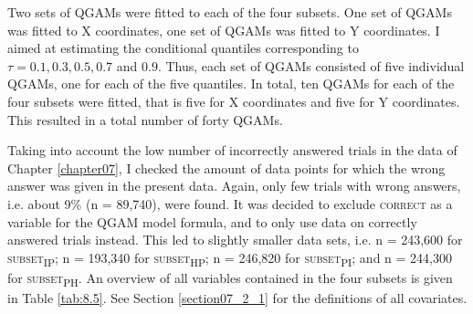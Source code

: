 Two sets of QGAMs were fitted to each of the four subsets. One set of QGAMs was fitted to X coordinates, one set of QGAMs was fitted to Y coordinates. I aimed at estimating the conditional quantiles corresponding to $\tau=0.1,0.3,0.5,0.7$ and $0.9$. Thus, each set of QGAMs consisted of five individual QGAMs, one for each of the five quantiles. In total, ten QGAMs for each of the four subsets were fitted, that is five for X coordinates and five for Y coordinates. This resulted in a total number of forty QGAMs.

Taking into account the low number of incorrectly answered trials in the data of Chapter \ref{chapter07}, I checked the amount of data points for which the wrong answer was given in the present data. Again, only few trials with wrong answers, i.e. about 9\% (n = 89,740), were found. It was decided to exclude \textsc{correct} as a variable for the QGAM model formula, and to only use data on correctly answered trials instead. This led to slightly smaller data sets, i.e. n = 243,600 for \textsc{subset\textsubscript{IP}}; n = 193,340 for \textsc{subset\textsubscript{HP}}; n = 246,820 for \textsc{subset\textsubscript{PI}}; and n = 244,300 for \textsc{subset\textsubscript{PH}}. An overview of all variables contained in the four subsets is given in Table \ref{tab:8.5}. See Section \ref{section07_2_1} for the definitions of all covariates.

